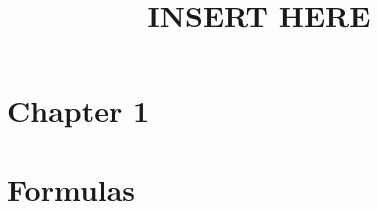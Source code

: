 \documentclass[12pt,a4paper]{article}
\title{INSERT HERE}
\date{}
\begin{document}
\maketitle

\tableofcontents

\section{Chapter 1}




\section{Formulas}

\end{document}
